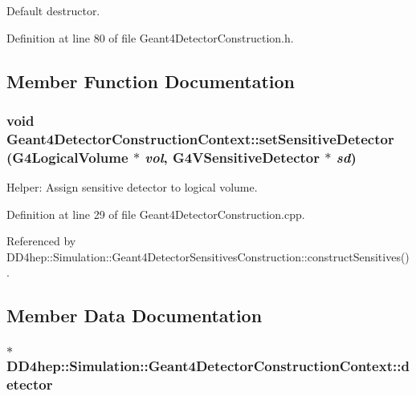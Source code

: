 Default destructor. 

Definition at line 80 of file Geant4DetectorConstruction.h.

\subsection{Member Function Documentation}
\hypertarget{class_d_d4hep_1_1_simulation_1_1_geant4_detector_construction_context_aa9715544debd86d973cf7c17c3ee0f7d}{
\subsubsection[{setSensitiveDetector}]{\setlength{\rightskip}{0pt plus 5cm}void Geant4DetectorConstructionContext::setSensitiveDetector (G4LogicalVolume $\ast$ {\em vol}, \/  {\bf G4VSensitiveDetector} $\ast$ {\em sd})}}
\label{class_d_d4hep_1_1_simulation_1_1_geant4_detector_construction_context_aa9715544debd86d973cf7c17c3ee0f7d}


Helper: Assign sensitive detector to logical volume. 

Definition at line 29 of file Geant4DetectorConstruction.cpp.

Referenced by DD4hep::Simulation::Geant4DetectorSensitivesConstruction::constructSensitives().

\subsection{Member Data Documentation}
\hypertarget{class_d_d4hep_1_1_simulation_1_1_geant4_detector_construction_context_a0fc040cea931da95d99ec7d3aca2199d}{
\subsubsection[{detector}]{$\ast$ {\bf DD4hep::Simulation::Geant4DetectorConstructionContext::detector}}}
\label{class_d_d4hep_1_1_simulation_1_1_geant4_detector_construction_context_a0fc040cea931da95d99ec7d3aca2199d}


